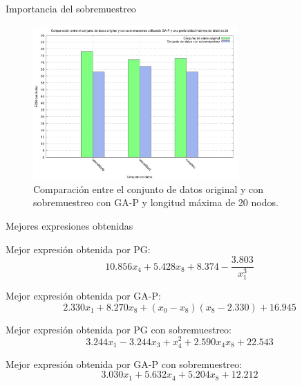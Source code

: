 \documentclass{beamer}
\begin{document}
\begin{frame}{Importancia del sobremuestreo}

	\begin{figure}[H]
	    \centering
		  \includegraphics[width=0.7\textwidth]{comparacion_over_gap_20.png}
		  \caption{Comparación entre el conjunto de datos original y con sobremuestreo con GA-P y longitud máxima de 20 nodos.}\label{fig:cmp_gap_over_20}

	\end{figure}


\end{frame}

\begin{frame}{Mejores expresiones obtenidas}

	Mejor expresión obtenida por PG:
	\begin{equation} \label{eq:PG_completo}
	10.856 x_{4} + 5.428 x_{8} + 8.374 - \frac{3.803}{x_{1}^{3}}
	\end{equation}

	Mejor expresión obtenida por GA-P:
	\begin{equation} \label{eq:GAP_completo}
	2.330 x_{1} + 8.270 x_{8} + \left(x_{0} - x_{8}\right) \left(x_{8} - 2.330\right) + 16.945
	\end{equation}

	Mejor expresión obtenida por PG con sobremuestreo:
	\begin{equation} \label{eq:PG_completo_over}
	3.244 x_{1} - 3.244 x_{3} + x_{4}^{2} + 2.590 x_{4} x_{8} + 22.543
	\end{equation}

	Mejor expresión obtenida por GA-P con sobremuestreo:
	\begin{equation} \label{eq:GAP_completo_over}
	3.030 x_{1} + 5.632 x_{4} + 5.204 x_{8} + 12.212
	\end{equation}

\end{frame}
\end{document}
